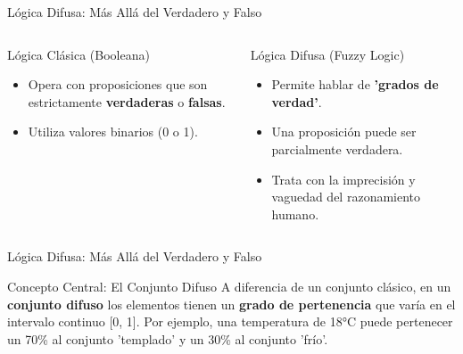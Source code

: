 \documentclass[aspectratio=169,xcolor=dvipsnames]{beamer}
\begin{document}
\begin{frame}{Lógica Difusa: Más Allá del Verdadero y Falso}
    \begin{columns}[t]
            \begin{block}{Lógica Clásica (Booleana)}
                \begin{itemize}
                    \item Opera con proposiciones que son estrictamente \textbf{verdaderas} o \textbf{falsas}.
                    \item Utiliza valores binarios (0 o 1).
                \end{itemize}
            \end{block}

            \begin{alertblock}{Lógica Difusa (Fuzzy Logic)}
                 \begin{itemize}
                    \item Permite hablar de \textbf{'grados de verdad'}.
                    \item Una proposición puede ser parcialmente verdadera.
                    \item Trata con la imprecisión y vaguedad del razonamiento humano.
                \end{itemize}
            \end{alertblock}
    \end{columns}
\end{frame}
\begin{frame}{Lógica Difusa: Más Allá del Verdadero y Falso}
    \begin{block}{Concepto Central: El Conjunto Difuso}
    A diferencia de un conjunto clásico, en un \textbf{conjunto difuso} los elementos tienen un \textbf{grado de pertenencia} que varía en el intervalo continuo [0, 1]. Por ejemplo, una temperatura de 18°C puede pertenecer un 70\% al conjunto 'templado' y un 30\% al conjunto 'frío'.
    \end{block}
\end{frame}

\end{document}
